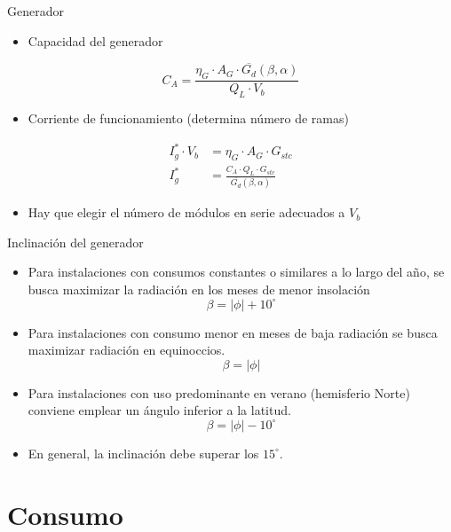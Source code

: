 \documentclass[xcolor={usenames,svgnames,dvipsnames}]{beamer}
\begin{document}
\begin{frame}[label={sec:org425aec1}]{Generador}
\begin{itemize}
\item Capacidad del generador
\end{itemize}
\[
C_{A} = \frac{\eta_{G}\cdot A_{G}\cdot\overline{G_{d}}(\beta,\alpha)}{Q_L \cdot V_b}
\]


\begin{itemize}
\item Corriente de funcionamiento (determina número de ramas)
\end{itemize}

\begin{align*}
I_{g}^{*}\cdot V_{b} &= \eta_{G}\cdot A_{G}\cdot G_{stc}\\
I_{g}^{*} &=  \frac{C_{A}\cdot Q_{L}\cdot G_{stc}}{\overline{G_{d}}(\beta,\alpha)}
\end{align*}

\begin{itemize}
\item Hay que elegir el número de módulos en serie adecuados a \(V_b\)
\end{itemize}
\end{frame}

\begin{frame}[label={sec:org17f1579}]{Inclinación del generador}
\begin{itemize}
\item Para instalaciones con \alert{consumos constantes o similares a lo largo del año}, se busca maximizar la radiación en los meses de menor insolación $$\beta=|\phi|+10^{\circ}$$

\item Para instalaciones con \alert{consumo menor en meses de baja radiación} se busca maximizar radiación en equinoccios.$$\beta=|\phi|$$

\item Para instalaciones con \alert{uso predominante en verano} (hemisferio Norte) conviene emplear un ángulo inferior a la latitud. $$\beta=|\phi|-10^{\circ}$$

\item En general, la inclinación \alert{debe superar} los \(15^{\circ}\).
\end{itemize}
\end{frame}

\section{Consumo}
\label{sec:orgcba67d2}
\end{document}
